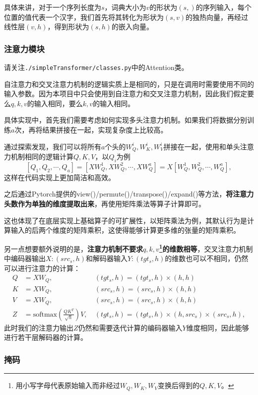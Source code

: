 具体来讲，对于一个序列长度为$s$，词典大小为$v$的形状为$(s,)$的序列输入，每个位置的值代表一个汉字，我们首先将其转化为形状为$(s,v)$的独热向量，再经过线性层$(v,h)$，得到形状为$(s,h)$的嵌入向量。

\subsubsection{注意力模块}

请关注\texttt{./simpleTransformer/classes.py}中的Attention类。

自注意力和交叉注意力机制的逻辑实质上是相同的，只是在调用时需要使用不同的输入参数。因为本项目中只会使用到自注意力和交叉注意力机制，因此我们假定要么$q,k,v$的输入相同，要么$k,v$的输入相同。

具体实现中，首先我们需要考虑如何实现多头注意力机制。如果我们将数据分别训练$a$次，再将结果拼接在一起，实现复杂度上比较高。

通过探索发现，我们可以将所有$a$个头的$W_Q^i,W_K^i,W_V^i$拼接在一起，使用和单头注意力机制相同的逻辑计算$Q,K,V$，以$Q_i$为例
$$
[Q_1, Q_2,\cdots , Q_a] = [XW_Q^1 , XW_Q^2 , \cdots, XW_Q^a ] = X[W_Q^1, W_Q^2, \cdots, W_Q^a],
$$
这样在代码实现上更加简洁和高效。

之后通过Pytorch提供的view()/permute()/transpose()/expand()等方法，\textbf{将注意力头数作为单独的维度提取出来}，再使用矩阵乘法等算子计算即可。

这也体现了在底层实现上基础算子的可扩展性，以矩阵乘法为例，其默认行为是计算输入的后两个维度的矩阵乘积，这使得能够计算更多维的张量的矩阵乘积。

另一点想要额外说明的是，\textbf{注意力机制不要求$q,k,v$\footnote{用小写字母代表原始输入而非经过$W_Q,W_K,W_V$变换后得到的$Q,K,V$。}的维数相等}，交叉注意力机制中编码器输出$X:(src_s,h)$和解码器输入$Y:(tgt_s,h)$的维数也可以不相同，仍然可以进行注意力的计算：
\begin{align*}
    Q &=X W_Q , \ &(tgt_s,h) = (tgt_s, h) \times (h,h) \\
    K &=X W_Q , \ &(src_s,h) = (src_s, h) \times (h,h) \\
    V &=X W_Q , \ &(src_s,h) = (src_s, h) \times (h,h) \\
    Z &= \text{softmax}(\frac{QK^T}{\sqrt{h}}) V, \ &(tgt_s, h) = (tgt_s, h) \times (h, src_s) \times (src_s, h),
\end{align*}
此时我们的注意力输出$Z$仍然和需要迭代计算的编码器输入$Y$维度相同，因此能够进行若干层解码器的计算。


\subsubsection{掩码}

